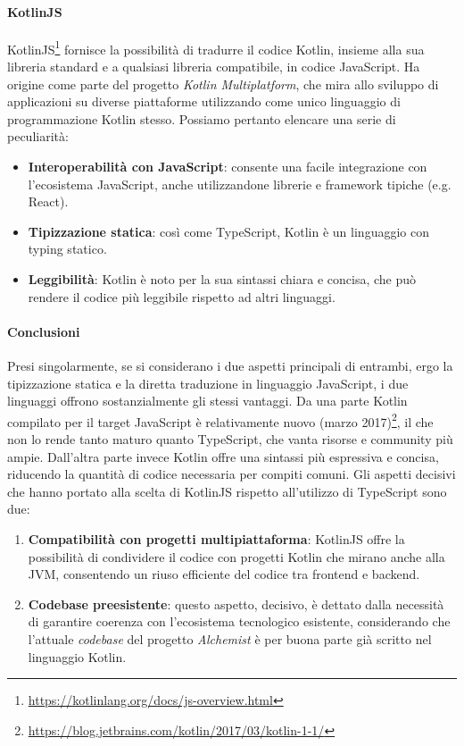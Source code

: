 \paragraph{KotlinJS}
KotlinJS\footnote{\url{https://kotlinlang.org/docs/js-overview.html}} fornisce la possibilità di tradurre il codice Kotlin, insieme alla sua libreria standard e a qualsiasi libreria compatibile, in codice JavaScript. Ha origine come parte del progetto \textit{Kotlin Multiplatform}, che mira allo sviluppo di applicazioni su diverse piattaforme utilizzando come unico linguaggio di programmazione Kotlin stesso. Possiamo pertanto elencare una serie di peculiarità:
\begin{itemize}
	\item \textbf{Interoperabilità con JavaScript}:  consente una facile integrazione con l'ecosistema JavaScript, anche utilizzandone librerie e framework tipiche (e.g. React). 
	\item \textbf{Tipizzazione statica}: così come TypeScript, Kotlin è un linguaggio con typing statico.
	\item \textbf{Leggibilità}: Kotlin è noto per la sua sintassi chiara e concisa, che può rendere il codice più leggibile rispetto ad altri linguaggi.
\end{itemize}

\paragraph{Conclusioni}
Presi singolarmente, se si considerano i due aspetti principali di entrambi, ergo la tipizzazione statica e la diretta traduzione in linguaggio JavaScript, i due linguaggi offrono sostanzialmente gli stessi vantaggi. Da una parte Kotlin compilato per il target JavaScript è relativamente nuovo (marzo 2017)\footnote{\url{https://blog.jetbrains.com/kotlin/2017/03/kotlin-1-1/}}, il che non lo rende tanto maturo quanto TypeScript, che vanta risorse e community più ampie. Dall'altra parte invece Kotlin offre una sintassi più espressiva e concisa, riducendo la quantità di codice necessaria per compiti comuni. Gli aspetti decisivi che hanno portato alla scelta di KotlinJS rispetto all'utilizzo di TypeScript sono due:
\begin{enumerate}
	\item \textbf{Compatibilità con progetti multipiattaforma}: KotlinJS offre la possibilità di condividere il codice con progetti Kotlin che mirano anche alla JVM, consentendo un riuso efficiente del codice tra frontend e backend.
	\item \textbf{Codebase preesistente}: questo aspetto, decisivo,  è dettato dalla necessità di garantire coerenza con l'ecosistema tecnologico esistente, considerando che l'attuale \textit{codebase} del progetto \textit{Alchemist} è per buona parte già scritto nel linguaggio Kotlin.
\end{enumerate}

